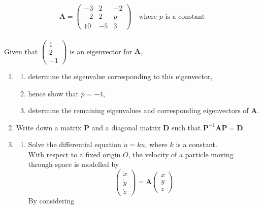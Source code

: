 \documentclass[leqno]{article}
\begin{document}
\begin{enumerate}[
  label=\textbf{\arabic*.},
  leftmargin=*,
  topsep=0pt,
  partopsep=0pt,
  parsep=0pt
]
\[\mathbf{A} = \begin{pmatrix} -3 & 2 & -2 \\ -2 & 2 & p \\ 10 & -5 & 3 \end{pmatrix} \quad \text{where } p \text{ is a constant}\] \\
Given that $\begin{pmatrix} 1 \\ 2 \\ -1 \end{pmatrix}$ is an eigenvector for $\mathbf{A}$, \\
\begin{enumerate}[label=\textbf{(\alph*)}]
  \item
  \begin{enumerate}[label=(\roman*)]
    \item determine the eigenvalue corresponding to this eigenvector, 
    \item hence show that $p = -4$, 
    \item determine the remaining eigenvalues and corresponding eigenvectors of $\mathbf{A}$.  \\
  \end{enumerate}
  \item Write down a matrix $\mathbf{P}$ and a diagonal matrix $\mathbf{D}$ such that $\mathbf{P}^{-1}\mathbf{A}\mathbf{P} = \mathbf{D}$.  \\
  \item
  \begin{enumerate}[label=(\roman*)]
    \item Solve the differential equation $\dot{u} = ku$, where $k$ is a constant.  \\
    With respect to a fixed origin $O$, the velocity of a particle moving through space is modelled by
    \[\begin{pmatrix} \dot{x} \\ \dot{y} \\ \dot{z} \end{pmatrix} = \mathbf{A} \begin{pmatrix} x \\ y \\ z \end{pmatrix}\]
    By considering

\end{enumerate}
\end{enumerate}
\end{enumerate}
\end{document}

